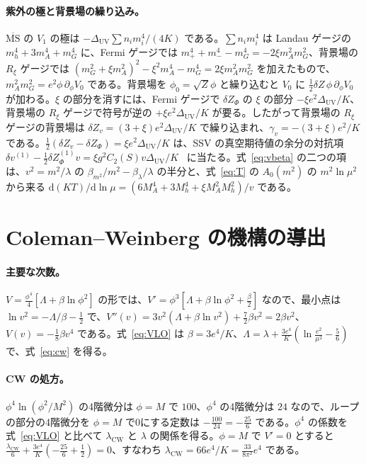 \documentclass[a4paper,10pt]{ltjsarticle}
\newcommand{\dd}{\mathrm{d}}
\newcommand{\MSbar}{\overline{\mathrm{MS}}}
\newcommand{\DUV}{\Delta_{\mathrm{UV}}}
\begin{document}
\paragraph{紫外の極と背景場の繰り込み。}$\MSbar$ の $V_1$ の極は $-\DUV\sum n_im_i^4/(4K)$ である。$\sum n_im_i^4$ は Landau ゲージの $m_h^4+3m_A^4+m_G^4$ に、Fermi ゲージでは $m_+^4+m_-^4-m_G^4=-2\xi m_A^2m_G^2$、背景場の $R_\xi$ ゲージでは $(m_G^2+\xi m_A^2)^2-\xi^2m_A^4-m_G^4=2\xi m_A^2m_G^2$ を加えたもので、$m_A^2m_G^2=e^2\phi\,\partial_\phi V_0$ である。背景場を $\phi_0=\sqrt{Z}\phi$ と繰り込むと $V_0$ に $\frac12\delta Z\,\phi\,\partial_\phi V_0$ が加わる。$\xi$ の部分を消すには、Fermi ゲージで $\delta Z_\Phi$ の $\xi$ の部分 $-\xi e^2\DUV/K$、背景場の $R_\xi$ ゲージで符号が逆の $+\xi e^2\DUV/K$ が要る。したがって背景場の $R_\xi$ ゲージの背景場は $\delta Z_v=(3+\xi)e^2\DUV/K$ で繰り込まれ、$\gamma_v=-(3+\xi)e^2/K$ である。$\frac12(\delta Z_v-\delta Z_\Phi)=\xi e^2\DUV/K$ は、SSV の真空期待値の余分の対抗項 $\delta v^{(1)}-\frac12\delta Z_\Phi^{(1)}v=\xi g^2C_2(S)v\DUV/K$~\cite{ssv13} に当たる。式~\eqref{eq:vbeta} の二つの項は、$v^2=m^2/\lambda$ の $\beta_{m^2}/m^2-\beta_\lambda/\lambda$ の半分と、式~\eqref{eq:T} の $A_0(m^2)$ の $m^2\ln\mu^2$ から来る $\dd(KT)/\dd\ln\mu=(6M_A^4+3M_h^4+\xi M_A^2M_h^2)/v$ である。

\section{Coleman--Weinberg の機構の導出}\label{app:cw}

\paragraph{主要な次数。}$V=\frac{\phi^4}4[\Lambda+\beta\ln\phi^2]$ の形では、$V'=\phi^3[\Lambda+\beta\ln\phi^2+\frac\beta2]$ なので、最小点は $\ln v^2=-\Lambda/\beta-\frac12$ で、$V''(v)=3v^2(\Lambda+\beta\ln v^2)+\frac72\beta v^2=2\beta v^2$、$V(v)=-\frac18\beta v^4$ である。式~\eqref{eq:VLO} は $\beta=3e^4/K$、$\Lambda=\lambda+\frac{3e^4}K(\ln\frac{e^2}{\mu^2}-\frac56)$ で、式~\eqref{eq:cw} を得る。

\paragraph{CW の処方。}$\phi^4\ln(\phi^2/M^2)$ の4階微分は $\phi=M$ で $100$、$\phi^4$ の4階微分は $24$ なので、ループの部分の4階微分を $\phi=M$ で0にする定数は $-\frac{100}{24}=-\frac{25}6$ である。$\phi^4$ の係数を式~\eqref{eq:VLO} と比べて $\lambda_{\mathrm{CW}}$ と $\lambda$ の関係を得る。$\phi=M$ で $V'=0$ とすると $\frac{\lambda_{\mathrm{CW}}}6+\frac{3e^4}K(-\frac{25}6+\frac12)=0$、すなわち $\lambda_{\mathrm{CW}}=66e^4/K=\frac{33}{8\pi^2}e^4$ である。
\end{document}
